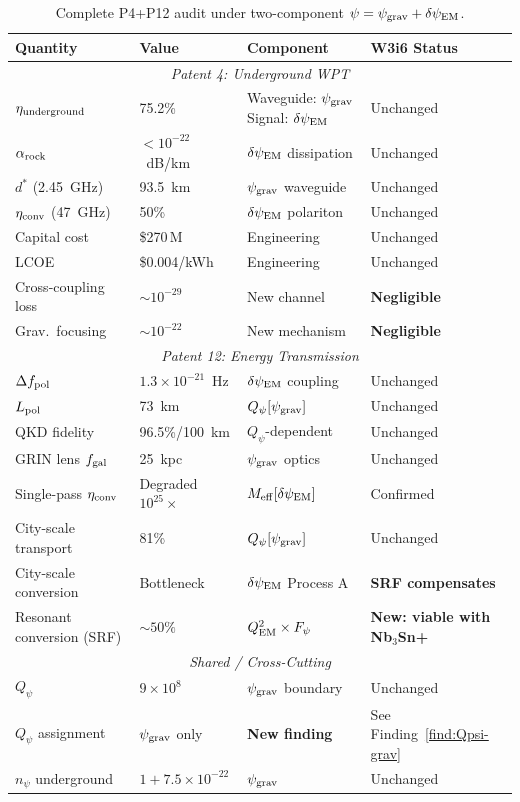 \documentclass[11pt]{article}
\newcommand{\ee}[1]{\times 10^{#1}}
\newcommand{\psigrav}{\psi_{\rm grav}}
\newcommand{\dpsiEM}{\delta\psi_{\rm EM}}
\newcommand{\Meff}{M_{\rm eff}}
\newcommand{\alpharock}{\alpha_{\rm rock}}
\newcommand{\Qpsi}{Q_\psi}
\newcommand{\npsi}{n_\psi}
\begin{document}
\begin{table}[h]
\centering
\caption{Complete P4+P12 audit under two-component $\psi = \psigrav + \dpsiEM$.}
\label{tab:P4P12-audit}
\begin{tabular}{p{4cm}p{2cm}p{2.5cm}p{4cm}}
\toprule
\textbf{Quantity} & \textbf{Value} & \textbf{Component} & \textbf{W3i6 Status} \\
\midrule
\multicolumn{4}{c}{\textit{Patent 4: Underground WPT}} \\
\midrule
$\eta_{\rm underground}$ & 75.2\% & Waveguide: $\psigrav$ \newline Signal: $\dpsiEM$
  & Unchanged \\
$\alpharock$ & $< 10^{-22}$~dB/km & $\dpsiEM$ dissipation & Unchanged \\
$d^*$ (2.45~GHz) & 93.5~km & $\psigrav$ waveguide & Unchanged \\
$\eta_{\rm conv}$ (47~GHz) & 50\% & $\dpsiEM$ polariton & Unchanged \\
Capital cost & \$270\,M & Engineering & Unchanged \\
LCOE & \$0.004/kWh & Engineering & Unchanged \\
Cross-coupling loss & $\sim 10^{-29}$ & New channel & \textbf{Negligible} \\
Grav.\ focusing & $\sim 10^{-22}$ & New mechanism & \textbf{Negligible} \\
\midrule
\multicolumn{4}{c}{\textit{Patent 12: Energy Transmission}} \\
\midrule
$\Delta f_{\rm pol}$ & $1.3\ee{-21}$~Hz & $\dpsiEM$ coupling & Unchanged \\
$L_{\rm pol}$ & 73~km & $\Qpsi[\psigrav]$ & Unchanged \\
QKD fidelity & 96.5\%/100~km & $\Qpsi$-dependent & Unchanged \\
GRIN lens $f_{\rm gal}$ & 25~kpc & $\psigrav$ optics & Unchanged \\
Single-pass $\eta_{\rm conv}$ & Degraded $10^{25}\times$ & $\Meff[\dpsiEM]$
  & Confirmed \\
City-scale transport & 81\% & $\Qpsi[\psigrav]$ & Unchanged \\
City-scale conversion & Bottleneck & $\dpsiEM$ Process A
  & \textbf{SRF compensates} \\
Resonant conversion (SRF) & $\sim 50\%$ & $Q_{\rm EM}^2\times F_\psi$
  & \textbf{New: viable with Nb$_3$Sn+} \\
\midrule
\multicolumn{4}{c}{\textit{Shared / Cross-Cutting}} \\
\midrule
$\Qpsi$ & $9\ee{8}$ & $\psigrav$ boundary & Unchanged \\
$\Qpsi$ assignment & $\psigrav$ only & \textbf{New finding} & See Finding~\ref{find:Qpsi-grav} \\
$\npsi$ underground & $1 + 7.5\ee{-22}$ & $\psigrav$ & Unchanged \\
\bottomrule
\end{tabular}
\end{table}
\end{document}

